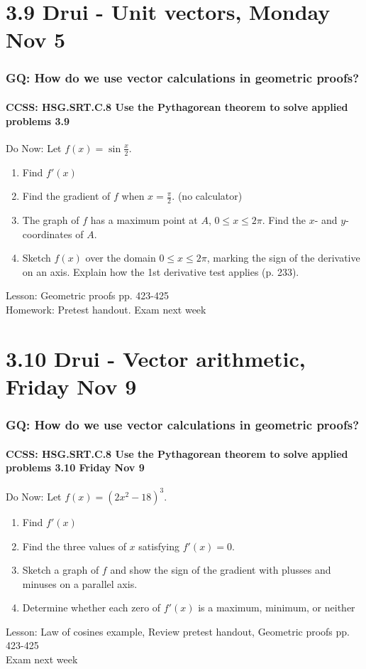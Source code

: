 \documentclass{beamer}
\begin{document}
\section{3.9 Drui - Unit vectors, Monday Nov 5}
  \frame
  {
    \frametitle{GQ: How do we use vector calculations in geometric proofs?}
    \framesubtitle{CCSS: HSG.SRT.C.8 Use the Pythagorean theorem to solve applied problems \qquad \alert{3.9}}
    \begin{block}{Do Now: Let $\displaystyle f(x)= \sin \frac{x}{2}$.}
    \begin{enumerate}
        \item Find $f'(x)$
        \item Find the gradient of $f$ when $x= \frac{\pi}{2}$. (no calculator)
        \item The graph of $f$ has a maximum point at $A$, $0 \leq x \leq 2\pi$. Find the $x$- and $y$-coordinates of $A$.
        \item Sketch $f(x)$ over the domain $0 \leq x \leq 2\pi$, marking the sign of the derivative on an axis. Explain how the 1st derivative test applies (p. 233).
    \end{enumerate}
    \end{block}

    Lesson: Geometric proofs pp. 423-425\\ \bigskip
    Homework: Pretest handout. \alert{Exam next week}
  }

\section{3.10 Drui - Vector arithmetic, Friday Nov 9}
  \frame
  {
    \frametitle{GQ: How do we use vector calculations in geometric proofs?}
    \framesubtitle{CCSS: HSG.SRT.C.8 Use the Pythagorean theorem to solve applied problems \qquad \alert{3.10 Friday Nov 9}}

    \begin{block}{Do Now: Let $f(x)= (2x^2-18)^3$.}
    \begin{enumerate}
        \item Find $f'(x)$
        \item Find the three values of $x$ satisfying $f'(x)=0$.
        \item Sketch a graph of $f$ and show the sign of the gradient with plusses and minuses on a parallel axis.
        \item Determine whether each zero of $f'(x)$ is a maximum, minimum, or neither
    \end{enumerate}
    \end{block}

    Lesson: Law of cosines example, Review pretest handout, Geometric proofs pp. 423-425\\ \bigskip
    \alert{Exam next week}
  }
\end{document}
